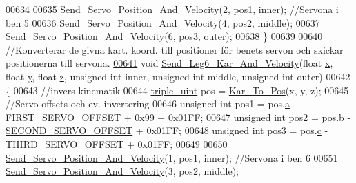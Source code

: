 \begin{DoxyCode}
00634     
00635     \hyperlink{servo___u_a_r_t_8c_aef28545296037ecc0350638a407a680f}{Send\_Servo\_Position\_And\_Velocity}(2, pos1, inner); \textcolor{comment}{//Servona i ben 5}
00636     \hyperlink{servo___u_a_r_t_8c_aef28545296037ecc0350638a407a680f}{Send\_Servo\_Position\_And\_Velocity}(4, pos2, middle);
00637     \hyperlink{servo___u_a_r_t_8c_aef28545296037ecc0350638a407a680f}{Send\_Servo\_Position\_And\_Velocity}(6, pos3, outer);
00638 \}
00639 
00640 \textcolor{comment}{//Konverterar de givna kart. koord. till positioner för benets servon och skickar positionerna till
       servona.}
\hypertarget{servo___u_a_r_t_8c_source.tex_l00641}{}\hyperlink{servo___u_a_r_t_8h_a8cd710e0714336201bd84b46a1e1877d}{00641} \textcolor{keywordtype}{void} \hyperlink{servo___u_a_r_t_8c_a8cd710e0714336201bd84b46a1e1877d}{Send\_Leg6\_Kar\_And\_Velocity}(\textcolor{keywordtype}{float} \hyperlink{sensor_8h_a6c4b361d72eb3767ba424ac9a6ecf52b}{x}, \textcolor{keywordtype}{float} \hyperlink{sensor_8h_a0ed6a908288e0cd87f79c1b5ab56d07c}{y}, \textcolor{keywordtype}{float} 
      \hyperlink{over__hinder_8c_af73583b1e980b0aa03f9884812e9fd4d}{z}, \textcolor{keywordtype}{unsigned} \textcolor{keywordtype}{int} inner, \textcolor{keywordtype}{unsigned} \textcolor{keywordtype}{int} middle, \textcolor{keywordtype}{unsigned} \textcolor{keywordtype}{int} outer)
00642 \{
00643     \textcolor{comment}{//invers kinematik }
00644     \hyperlink{structtriple__uint}{triple\_uint} pos = \hyperlink{invers__kinematik_8c_a68f82386196ad991ed54fb9796d90f7c}{Kar\_To\_Pos}(x, y, z);
00645     \textcolor{comment}{//Servo-offsets och ev. invertering }
00646     \textcolor{keywordtype}{unsigned} \textcolor{keywordtype}{int} pos1 = pos.\hyperlink{structtriple__uint_a0ea8a85723620c90be9fd2a693f12a59}{a} - \hyperlink{servo___u_a_r_t_8c_a4c437d01d2f060ec86c16ed5e76efe45}{FIRST\_SERVO\_OFFSET} + 0x99 + 0x01FF;
00647     \textcolor{keywordtype}{unsigned} \textcolor{keywordtype}{int} pos2 = pos.\hyperlink{structtriple__uint_a790d5baa17ec7aaf7bb49750a16e9c29}{b} - \hyperlink{servo___u_a_r_t_8c_acb02dedbe5ff19694bdb5b2ddf61664a}{SECOND\_SERVO\_OFFSET} + 0x01FF;
00648     \textcolor{keywordtype}{unsigned} \textcolor{keywordtype}{int} pos3 = pos.\hyperlink{structtriple__uint_a6ce17b018c47d0f1d0e53a458f741ad3}{c} - \hyperlink{servo___u_a_r_t_8c_ac2f065c44b617c91ea7f4237e8ead729}{THIRD\_SERVO\_OFFSET} + 0x01FF;
00649     
00650     \hyperlink{servo___u_a_r_t_8c_aef28545296037ecc0350638a407a680f}{Send\_Servo\_Position\_And\_Velocity}(1, pos1, inner); \textcolor{comment}{//Servona i ben 6}
00651     \hyperlink{servo___u_a_r_t_8c_aef28545296037ecc0350638a407a680f}{Send\_Servo\_Position\_And\_Velocity}(3, pos2, middle);

\end{DoxyCode}
